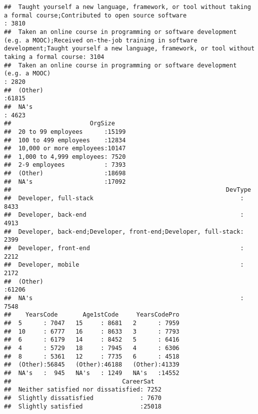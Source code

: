 \documentclass[]{article}
\begin{document}
\begin{verbatim}
##  Taught yourself a new language, framework, or tool without taking a formal course;Contributed to open source software                                                                                             : 3810  
##  Taken an online course in programming or software development (e.g. a MOOC);Received on-the-job training in software development;Taught yourself a new language, framework, or tool without taking a formal course: 3104  
##  Taken an online course in programming or software development (e.g. a MOOC)                                                                                                                                       : 2820  
##  (Other)                                                                                                                                                                                                           :61815  
##  NA's                                                                                                                                                                                                              : 4623  
##                      OrgSize     
##  20 to 99 employees      :15199  
##  100 to 499 employees    :12834  
##  10,000 or more employees:10147  
##  1,000 to 4,999 employees: 7520  
##  2-9 employees           : 7393  
##  (Other)                 :18698  
##  NA's                    :17092  
##                                                            DevType     
##  Developer, full-stack                                         : 8433  
##  Developer, back-end                                           : 4913  
##  Developer, back-end;Developer, front-end;Developer, full-stack: 2399  
##  Developer, front-end                                          : 2212  
##  Developer, mobile                                             : 2172  
##  (Other)                                                       :61206  
##  NA's                                                          : 7548  
##    YearsCode       Age1stCode     YearsCodePro  
##  5      : 7047   15     : 8681   2      : 7959  
##  10     : 6777   16     : 8633   3      : 7793  
##  6      : 6179   14     : 8452   5      : 6416  
##  4      : 5729   18     : 7945   4      : 6306  
##  8      : 5361   12     : 7735   6      : 4518  
##  (Other):56845   (Other):46188   (Other):41339  
##  NA's   :  945   NA's   : 1249   NA's   :14552  
##                               CareerSat    
##  Neither satisfied nor dissatisfied: 7252  
##  Slightly dissatisfied             : 7670  
##  Slightly satisfied                :25018  

\end{verbatim}
\end{document}
